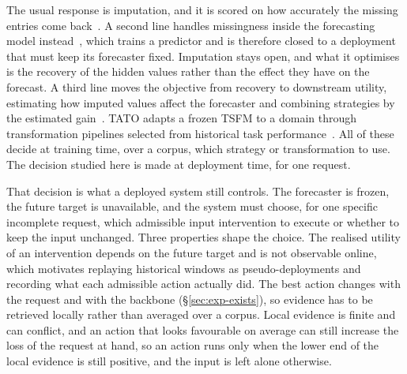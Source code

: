 \documentclass{article}
\newcommand{\tsfm}{TSFM}
\begin{document}
The usual response is imputation, and it is scored on how accurately the missing entries come
back~\citep{cao2018brits,tashiro2021csdi,du2023saits}. A second line handles missingness inside
the forecasting model instead~\citep{chen2024bitgraph,peng2025s4m}, which trains a predictor and
is therefore closed to a deployment that must keep its forecaster fixed. Imputation stays open,
and what it optimises is the recovery of the hidden values rather than the effect they have on
the forecast. A third line moves the objective from recovery to downstream utility, estimating
how imputed values affect the forecaster and combining strategies by the estimated
gain~\citep{wang2024taskoriented,hao2025toivsf,xu2026srdi}. TATO adapts a frozen \tsfm{} to a
domain through transformation pipelines selected from historical task
performance~\citep{qiu2026tato}. All of these decide at training time, over a corpus, which
strategy or transformation to use. The decision studied here is made at deployment time, for
one request.

That decision is what a deployed system still controls. The forecaster is frozen, the
future target is unavailable, and the system must choose, for one specific incomplete request,
which admissible input intervention to execute or whether to keep the input unchanged. Three
properties shape the choice. The realised utility of an intervention depends on the future
target and is not observable online, which motivates replaying historical windows as
pseudo-deployments and recording what each admissible action actually did. The best action
changes with the request and with the backbone (\S\ref{sec:exp-exists}), so evidence has to be
retrieved locally rather than averaged over a corpus. Local evidence is finite and can
conflict, and an action that looks favourable on average can still increase the loss of the
request at hand, so an action runs only when the lower end of the local evidence is still
positive, and the input is left alone otherwise.
\end{document}
